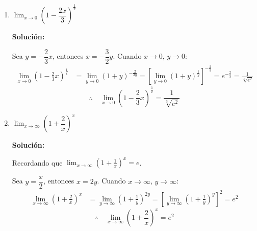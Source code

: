 \documentclass[12pt]{article}
\newcommand{\solucion}{%
    \vspace{0.8em}%
    \textbf{Solución:}%
}
\begin{document}
\begin{enumerate}[label=\alph*)]
    \solucion

    Usamos la identidad trigonométrica:
    \[
        (1-\cos(2x))(1+\cos(2x))=\operatorname{sen}^2(2x)
    \]
    de donde:
    \[
        1-\cos(2x)=\frac{\operatorname{sen}^2(2x)}{1+\cos(2x)}
    \]
    Sustituyendo en el límite:
    \begin{align*}
        \lim_{x\to0}\frac{1-\cos(2x)}{x}
        &= \lim_{x\to0}\frac{\operatorname{sen}^2(2x)}{x(1+\cos(2x))} \\[6pt]
        &= \lim_{x\to0}
            \left(\frac{\operatorname{sen}(2x)}{x}\right)
            \left(\frac{\operatorname{sen}(2x)}{1+\cos(2x)}\right) \\[6pt]
        &= \left(\lim_{x\to0}\frac{\operatorname{sen}(2x)}{x}\right)
            \left(\lim_{x\to0}\frac{\operatorname{sen}(2x)}{1+\cos(2x)}\right) \\[6pt]
        &= \left(2\lim_{x\to0}\frac{\operatorname{sen}(2x)}{2x}\right)
            \left(\frac{\operatorname{sen}(0)}{1+\cos(0)}\right) \\[6pt]
        &= (2 \cdot 1)\left(\frac{0}{2}\right) = 0
    \end{align*}
    \[
        \therefore\quad \lim_{x\to0}\frac{1-\cos(2x)}{x} = 0
    \]

    \item $\lim_{x \to 0} \left(1 - \dfrac{2x}{3}\right)^{\frac{1}{x}}$

    \solucion

    Sea $y = -\dfrac{2}{3}x$, entonces $x = -\dfrac{3}{2}y$. Cuando $x\to0$, $y\to0$:
    \begin{align*}
        \lim_{x\to0}\left(1-\frac{2}{3}x\right)^{\frac{1}{x}}
        &= \lim_{y\to0}(1+y)^{-\frac{2}{3y}}
        = \left[\lim_{y\to0}(1+y)^{\frac{1}{y}}\right]^{-\frac{2}{3}}
        = e^{-\frac{2}{3}}
        = \frac{1}{\sqrt[3]{e^2}}
    \end{align*}
    \[
        \therefore\quad \lim_{x\to0}\left(1-\frac{2}{3}x\right)^{\frac{1}{x}} = \frac{1}{\sqrt[3]{e^2}}
    \]

    \newpage
    \item $\lim_{x \to \infty} \left(1 + \dfrac{2}{x}\right)^x$

    \solucion

    Recordando que $\displaystyle\lim_{x\to\infty}\left(1+\frac{1}{x}\right)^x = e$.
    
    Sea $y = \dfrac{x}{2}$, entonces $x = 2y$. Cuando $x\to\infty$, $y\to\infty$:
    \begin{align*}
        \lim_{x\to\infty}\left(1+\frac{2}{x}\right)^x
        &= \lim_{y\to\infty}\left(1+\frac{1}{y}\right)^{2y}
        = \left[\lim_{y\to\infty}\left(1+\frac{1}{y}\right)^y\right]^2
        = e^2
    \end{align*}
    \[
        \therefore\quad \lim_{x\to\infty}\left(1+\frac{2}{x}\right)^x = e^2
    \]


\end{enumerate}
\end{document}
